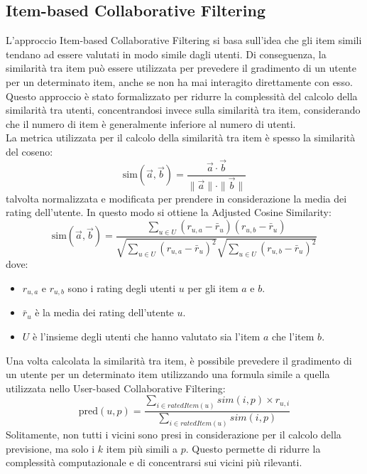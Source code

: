 \documentclass{report}
\begin{document}
	\subsection{Item-based Collaborative Filtering}
	L'approccio Item-based Collaborative Filtering si basa sull'idea che gli item simili tendano ad essere valutati in modo simile dagli utenti. Di conseguenza, la similarità tra item può essere utilizzata per prevedere il gradimento di un utente per un determinato item, anche se non ha mai interagito direttamente con esso. Questo approccio è stato formalizzato per ridurre la complessità del calcolo della similarità tra utenti, concentrandosi invece sulla similarità tra item, considerando che il numero di item è generalmente inferiore al numero di utenti.
	\vspace{\baselineskip}\\
	La metrica utilizzata per il calcolo della similarità tra item è spesso la similarità del coseno:
	\[
		\text{sim}(\overrightarrow{a}, \overrightarrow{b}) = \frac{\overrightarrow{a} \cdot \overrightarrow{b}}{\|\overrightarrow{a}\| \cdot \|\overrightarrow{b}\|}
	\]
	talvolta normalizzata e modificata per prendere in considerazione la media dei rating dell'utente. In questo modo si ottiene la Adjusted Cosine Similarity:
	\[
		\text{sim}(\overrightarrow{a}, \overrightarrow{b}) = \frac{\sum_{u \in U} (r_{u,a} - \bar{r}_u)(r_{u,b} - \bar{r}_u)}{\sqrt{\sum_{u \in U} (r_{u,a} - \bar{r}_u)^2} \sqrt{\sum_{u \in U} (r_{u,b} - \bar{r}_u)^2}}
	\]
	dove:
	\begin{itemize}
		\item \(r_{u,a}\) e \(r_{u,b}\) sono i rating degli utenti \(u\) per gli item \(a\) e \(b\).
		\item \(\bar{r}_u\) è la media dei rating dell'utente \(u\).
		\item \(U\) è l'insieme degli utenti che hanno valutato sia l'item \(a\) che l'item \(b\).
	\end{itemize}
	Una volta calcolata la similarità tra item, è possibile prevedere il gradimento di un utente per un determinato item utilizzando una formula simile a quella utilizzata nello User-based Collaborative Filtering:
	\[
		\text{pred}(u, p) = \frac{\sum_{i \in ratedItem(u)} sim(i,p) \times r_{u,i}}{\sum_{i \in ratedItem(u)} sim(i,p)}
	\]
	Solitamente, non tutti i vicini sono presi in considerazione per il calcolo della previsione, ma solo i \(k\) item più simili a \(p\). Questo permette di ridurre la complessità computazionale e di concentrarsi sui vicini più rilevanti.
\end{document}

